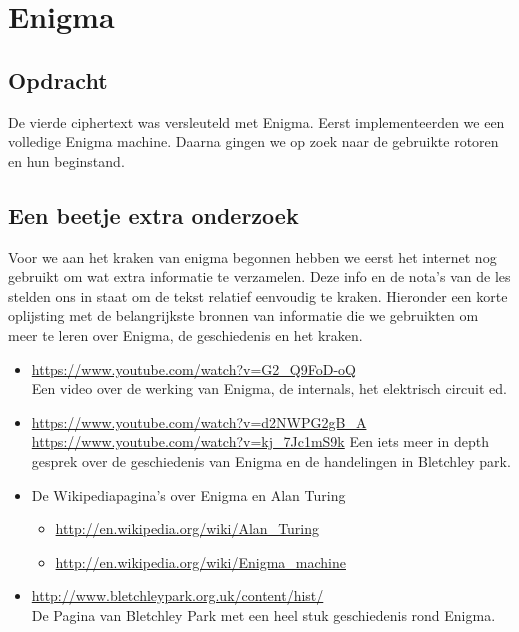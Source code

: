 
\section{Enigma}
\subsection{Opdracht}
De vierde ciphertext was versleuteld met Enigma. Eerst implementeerden we een volledige Enigma machine. Daarna gingen we op zoek naar de gebruikte rotoren en hun beginstand.

\subsection{Een beetje extra onderzoek}
Voor we aan het kraken van enigma begonnen hebben we eerst het internet nog gebruikt om wat extra informatie te verzamelen. Deze info en de nota's van de les stelden ons in staat om de tekst relatief eenvoudig te kraken.
Hieronder een korte oplijsting met de belangrijkste bronnen van informatie die we gebruikten om meer te leren over Enigma, de geschiedenis en het kraken.

\begin{itemize}
\item \url{https://www.youtube.com/watch?v=G2_Q9FoD-oQ} \\
	Een video over de werking van Enigma, de internals, het elektrisch circuit ed.
\item \url{https://www.youtube.com/watch?v=d2NWPG2gB_A}
\url{https://www.youtube.com/watch?v=kj_7Jc1mS9k}
Een iets meer in depth gesprek over de geschiedenis van Enigma en de handelingen in Bletchley park.
\item De Wikipediapagina's over Enigma en Alan Turing
	\begin{itemize}
		\item \url{http://en.wikipedia.org/wiki/Alan_Turing}
		\item \url{http://en.wikipedia.org/wiki/Enigma_machine}
	\end{itemize}
	\item \url{http://www.bletchleypark.org.uk/content/hist/} \\ De Pagina van Bletchley Park met een heel stuk geschiedenis rond Enigma.
\end{itemize}


